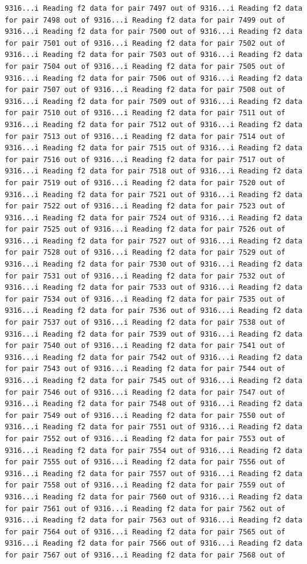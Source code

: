 \documentclass[
]{article}
\begin{document}
\begin{verbatim}
9316...i Reading f2 data for pair 7497 out of 9316...i Reading f2 data for pair 7498 out of 9316...i Reading f2 data for pair 7499 out of 9316...i Reading f2 data for pair 7500 out of 9316...i Reading f2 data for pair 7501 out of 9316...i Reading f2 data for pair 7502 out of 9316...i Reading f2 data for pair 7503 out of 9316...i Reading f2 data for pair 7504 out of 9316...i Reading f2 data for pair 7505 out of 9316...i Reading f2 data for pair 7506 out of 9316...i Reading f2 data for pair 7507 out of 9316...i Reading f2 data for pair 7508 out of 9316...i Reading f2 data for pair 7509 out of 9316...i Reading f2 data for pair 7510 out of 9316...i Reading f2 data for pair 7511 out of 9316...i Reading f2 data for pair 7512 out of 9316...i Reading f2 data for pair 7513 out of 9316...i Reading f2 data for pair 7514 out of 9316...i Reading f2 data for pair 7515 out of 9316...i Reading f2 data for pair 7516 out of 9316...i Reading f2 data for pair 7517 out of 9316...i Reading f2 data for pair 7518 out of 9316...i Reading f2 data for pair 7519 out of 9316...i Reading f2 data for pair 7520 out of 9316...i Reading f2 data for pair 7521 out of 9316...i Reading f2 data for pair 7522 out of 9316...i Reading f2 data for pair 7523 out of 9316...i Reading f2 data for pair 7524 out of 9316...i Reading f2 data for pair 7525 out of 9316...i Reading f2 data for pair 7526 out of 9316...i Reading f2 data for pair 7527 out of 9316...i Reading f2 data for pair 7528 out of 9316...i Reading f2 data for pair 7529 out of 9316...i Reading f2 data for pair 7530 out of 9316...i Reading f2 data for pair 7531 out of 9316...i Reading f2 data for pair 7532 out of 9316...i Reading f2 data for pair 7533 out of 9316...i Reading f2 data for pair 7534 out of 9316...i Reading f2 data for pair 7535 out of 9316...i Reading f2 data for pair 7536 out of 9316...i Reading f2 data for pair 7537 out of 9316...i Reading f2 data for pair 7538 out of 9316...i Reading f2 data for pair 7539 out of 9316...i Reading f2 data for pair 7540 out of 9316...i Reading f2 data for pair 7541 out of 9316...i Reading f2 data for pair 7542 out of 9316...i Reading f2 data for pair 7543 out of 9316...i Reading f2 data for pair 7544 out of 9316...i Reading f2 data for pair 7545 out of 9316...i Reading f2 data for pair 7546 out of 9316...i Reading f2 data for pair 7547 out of 9316...i Reading f2 data for pair 7548 out of 9316...i Reading f2 data for pair 7549 out of 9316...i Reading f2 data for pair 7550 out of 9316...i Reading f2 data for pair 7551 out of 9316...i Reading f2 data for pair 7552 out of 9316...i Reading f2 data for pair 7553 out of 9316...i Reading f2 data for pair 7554 out of 9316...i Reading f2 data for pair 7555 out of 9316...i Reading f2 data for pair 7556 out of 9316...i Reading f2 data for pair 7557 out of 9316...i Reading f2 data for pair 7558 out of 9316...i Reading f2 data for pair 7559 out of 9316...i Reading f2 data for pair 7560 out of 9316...i Reading f2 data for pair 7561 out of 9316...i Reading f2 data for pair 7562 out of 9316...i Reading f2 data for pair 7563 out of 9316...i Reading f2 data for pair 7564 out of 9316...i Reading f2 data for pair 7565 out of 9316...i Reading f2 data for pair 7566 out of 9316...i Reading f2 data for pair 7567 out of 9316...i Reading f2 data for pair 7568 out of 
\end{verbatim}
\end{document}
